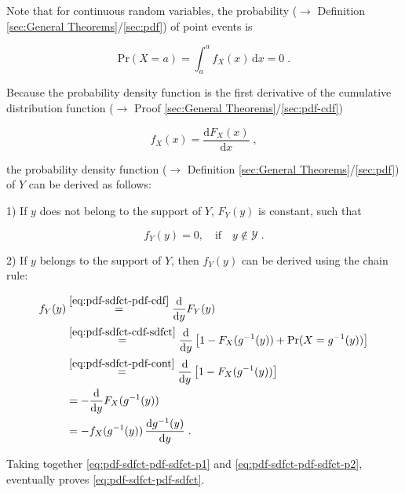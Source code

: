 \documentclass[a4paper,12pt,twoside]{book}
\begin{document}
Note that for continuous random variables, the probability ($\rightarrow$ Definition \ref{sec:General Theorems}/\ref{sec:pdf}) of point events is

\begin{equation} \label{eq:pdf-sdfct-pdf-cont}
\mathrm{Pr}(X = a) = \int_a^a f_X(x) \, \mathrm{d}x = 0 \; .
\end{equation}

Because the probability density function is the first derivative of the cumulative distribution function ($\rightarrow$ Proof \ref{sec:General Theorems}/\ref{sec:pdf-cdf})

\begin{equation} \label{eq:pdf-sdfct-pdf-cdf}
f_X(x) = \frac{\mathrm{d}F_X(x)}{\mathrm{d}x} \; ,
\end{equation}

the probability density function ($\rightarrow$ Definition \ref{sec:General Theorems}/\ref{sec:pdf}) of $Y$ can be derived as follows:

1) If $y$ does not belong to the support of $Y$, $F_Y(y)$ is constant, such that

\begin{equation} \label{eq:pdf-sdfct-pdf-sdfct-p1}
f_Y(y) = 0, \quad \text{if} \quad y \notin \mathcal{Y} \; .
\end{equation}

2) If $y$ belongs to the support of $Y$, then $f_Y(y)$ can be derived using the chain rule:

\begin{equation} \label{eq:pdf-sdfct-pdf-sdfct-p2}
\begin{split}
f_Y(y) &\overset{\eqref{eq:pdf-sdfct-pdf-cdf}}{=} \frac{\mathrm{d}}{\mathrm{d}y} F_Y(y) \\
&\overset{\eqref{eq:pdf-sdfct-cdf-sdfct}}{=} \frac{\mathrm{d}}{\mathrm{d}y} \left[ 1 - F_X(g^{-1}(y)) + \mathrm{Pr}(X = g^{-1}(y)) \right] \\
&\overset{\eqref{eq:pdf-sdfct-pdf-cont}}{=} \frac{\mathrm{d}}{\mathrm{d}y} \left[ 1 - F_X(g^{-1}(y)) \right] \\
&= -\frac{\mathrm{d}}{\mathrm{d}y} F_X(g^{-1}(y)) \\
&= - f_X(g^{-1}(y)) \, \frac{\mathrm{d}g^{-1}(y)}{\mathrm{d}y} \; .
\end{split}
\end{equation}

Taking together \eqref{eq:pdf-sdfct-pdf-sdfct-p1} and \eqref{eq:pdf-sdfct-pdf-sdfct-p2}, eventually proves \eqref{eq:pdf-sdfct-pdf-sdfct}.
\end{document}
